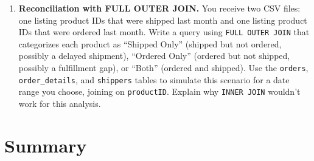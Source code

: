 \documentclass[
  letterpaper,
  DIV=11,
  numbers=noendperiod]{scrreprt}
\newenvironment{Shaded}{\begin{snugshade}}{\end{snugshade}}
\newcommand{\CommentTok}[1]{\textcolor[rgb]{0.37,0.37,0.37}{#1}}
\newcommand{\FunctionTok}[1]{\textcolor[rgb]{0.28,0.35,0.67}{#1}}
\newcommand{\KeywordTok}[1]{\textcolor[rgb]{0.00,0.23,0.31}{\textbf{#1}}}
\newcommand{\NormalTok}[1]{\textcolor[rgb]{0.00,0.23,0.31}{#1}}
\newcommand{\OperatorTok}[1]{\textcolor[rgb]{0.37,0.37,0.37}{#1}}
\begin{document}
\begin{enumerate}
\begin{codelisting}
\begin{Shaded}
\begin{Highlighting}[]
\CommentTok{{-}{-} Query B}
\KeywordTok{SELECT} \FunctionTok{COUNT}\NormalTok{(}\OperatorTok{*}\NormalTok{)}
\KeywordTok{FROM}\NormalTok{ employees }\KeywordTok{AS}\NormalTok{ e}
\KeywordTok{LEFT} \KeywordTok{JOIN}\NormalTok{ orders }\KeywordTok{AS}\NormalTok{ o }\KeywordTok{ON}\NormalTok{ e.employeeID }\OperatorTok{=}\NormalTok{ o.employeeID;}

\CommentTok{{-}{-} Query C}
\KeywordTok{SELECT} \FunctionTok{COUNT}\NormalTok{(}\OperatorTok{*}\NormalTok{)}
\KeywordTok{FROM}\NormalTok{ employees }\KeywordTok{AS}\NormalTok{ e}
\KeywordTok{LEFT} \KeywordTok{JOIN}\NormalTok{ orders }\KeywordTok{AS}\NormalTok{ o }\KeywordTok{ON}\NormalTok{ e.employeeID }\OperatorTok{=}\NormalTok{ o.employeeID}
\KeywordTok{WHERE}\NormalTok{ o.orderID }\KeywordTok{IS} \KeywordTok{NULL}\NormalTok{;}
\end{Highlighting}
\end{Shaded}

  \end{codelisting}

  Explain what business question Query C answers and why it's a useful
  pattern.
\item
  \textbf{Reconciliation with FULL OUTER JOIN.} You receive two CSV
  files: one listing product IDs that were shipped last month and one
  listing product IDs that were ordered last month. Write a query using
  \texttt{FULL\ OUTER\ JOIN} that categorizes each product as ``Shipped
  Only'' (shipped but not ordered, possibly a delayed shipment),
  ``Ordered Only'' (ordered but not shipped, possibly a fulfillment
  gap), or ``Both'' (ordered and shipped). Use the \texttt{orders},
  \texttt{order\_details}, and \texttt{shippers} tables to simulate this
  scenario for a date range you choose, joining on \texttt{productID}.
  Explain why \texttt{INNER\ JOIN} wouldn't work for this analysis.
\end{enumerate}

\section{Summary}\label{summary-7}
\end{document}
